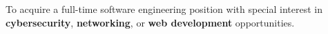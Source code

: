 

\begin{cvparagraph}

To acquire a full-time software engineering position with special interest in
\textbf{cybersecurity}, \textbf{networking}, or \textbf{web development}
opportunities.

\end{cvparagraph}
